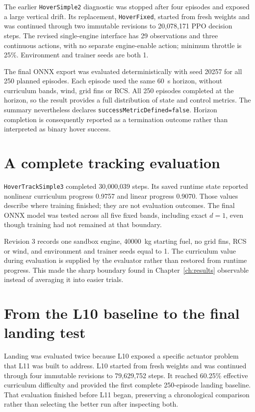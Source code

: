The earlier \texttt{HoverSimple2} diagnostic was stopped after four episodes and exposed a
large vertical drift. Its replacement, \texttt{HoverFixed}, started from fresh weights and was
continued through two immutable revisions to 20,078,171 PPO decision steps. The revised
single-engine interface has 29 observations and three continuous actions, with no separate
engine-enable action; minimum throttle is 25\%. Environment and trainer seeds are both 1.

The final ONNX export was evaluated deterministically with seed 20257 for all 250 planned
episodes. Each episode used the same \SI{60}{s} horizon, without curriculum bands, wind, grid
fins or RCS. All 250 episodes completed at the horizon, so the result provides a full distribution
of state and control metrics. The summary nevertheless declares
\texttt{successMetricDefined=false}. Horizon completion is consequently reported as a
termination outcome rather than interpreted as binary hover success.

\section{A complete tracking evaluation}

\texttt{HoverTrackSimple3} completed 30,000,039 steps. Its saved runtime state reported nonlinear
curriculum progress 0.9757 and linear progress 0.9070. Those values describe where training
finished; they are not evaluation outcomes. The final ONNX model was tested across all five
fixed bands, including exact $d=1$, even though training had not remained at that boundary.

Revision 3 records one sandbox engine, \SI{40000}{kg} starting fuel, no grid fins, RCS or wind,
and environment and trainer seeds equal to 1. The curriculum value during evaluation is supplied
by the evaluator rather than restored from runtime progress. This made the sharp boundary found
in Chapter~\ref{ch:results} observable instead of averaging it into easier trials.

\section{From the L10 baseline to the final landing test}

Landing was evaluated twice because L10 exposed a specific actuator problem that L11 was built
to address. L10 started from fresh weights and was continued through four immutable revisions to
79,629,752 steps. It reached 60.25\% effective curriculum difficulty and provided the first
complete 250-episode landing baseline. That evaluation finished before L11 began, preserving a
chronological comparison rather than selecting the better run after inspecting both.


